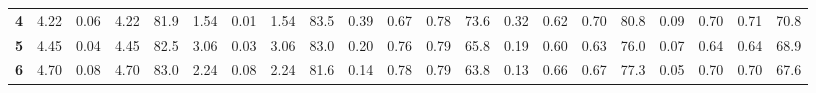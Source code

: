 \begin{tabular}{l|rrrr|rrrr|rrrr|rrrr|rrrr}
	\textbf{4  } &                     4.22 &                  0.06 &          4.22 &                  81.9 &                     1.54 &                  0.01 &          1.54 &                  83.5 &                     0.39 &                  0.67 &          0.78 &                  73.6 &                     0.32 &                  0.62 &          0.70 &                  80.8 &                     0.09 &                  0.70 &          0.71 &                  70.8 \\
	\textbf{5  } &                     4.45 &                  0.04 &          4.45 &                  82.5 &                     3.06 &                  0.03 &          3.06 &                  83.0 &                     0.20 &                  0.76 &          0.79 &                  65.8 &                     0.19 &                  0.60 &          0.63 &                  76.0 &                     0.07 &                  0.64 &          0.64 &                  68.9 \\
	\textbf{6  } &                     4.70 &                  0.08 &          4.70 &                  83.0 &                     2.24 &                  0.08 &          2.24 &                  81.6 &                     0.14 &                  0.78 &          0.79 &                  63.8 &                     0.13 &                  0.66 &          0.67 &                  77.3 &                     0.05 &                  0.70 &          0.70 &                  67.6 \\
	\bottomrule
\end{tabular}
